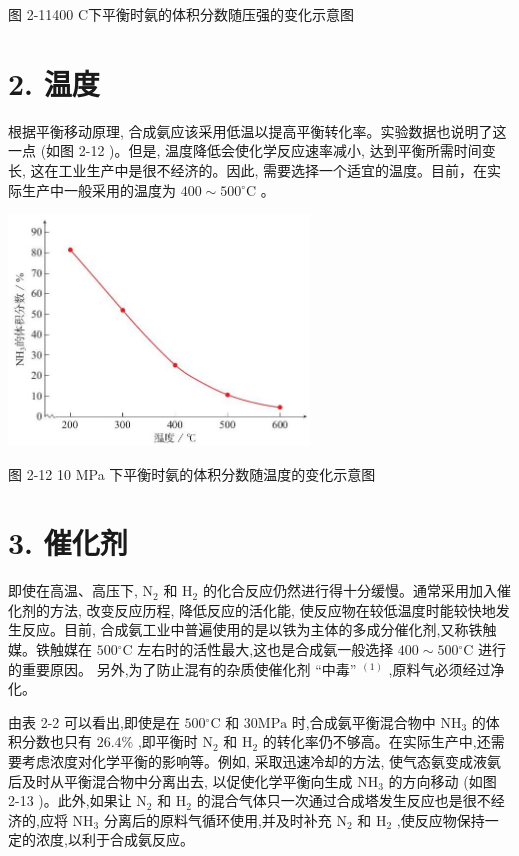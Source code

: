 \documentclass[10pt]{article}
\begin{document}
图 2-11400 C下平衡时氨的体积分数随压强的变化示意图

\section*{2. 温度}

根据平衡移动原理, 合成氨应该采用低温以提高平衡转化率。实验数据也说明了这一点 (如图 2-12 )。但是, 温度降低会使化学反应速率减小, 达到平衡所需时间变长, 这在工业生产中是很不经济的。因此, 需要选择一个适宜的温度。目前，在实际生产中一般采用的温度为 \({400} \sim {500}{}^{ \circ }\mathrm{C}\) 。

\begin{center}
\includegraphics[max width=0.6\textwidth]{images/0190da9d-8bfd-732f-bc2c-0b21d0f13b91_53_482358.jpg}
\end{center}

图 2-12 10 MPa 下平衡时氨的体积分数随温度的变化示意图

\section*{3. 催化剂}

即使在高温、高压下, \({\mathrm{N}}_{2}\) 和 \({\mathrm{H}}_{2}\) 的化合反应仍然进行得十分缓慢。通常采用加入催化剂的方法, 改变反应历程, 降低反应的活化能, 使反应物在较低温度时能较快地发生反应。目前, 合成氨工业中普遍使用的是以铁为主体的多成分催化剂,又称铁触媒。铁触媒在 \({500}{}^{ \circ }\mathrm{C}\) 左右时的活性最大,这也是合成氨一般选择 \({400} \sim {500}{}^{ \circ }\mathrm{C}\) 进行的重要原因。 另外,为了防止混有的杂质使催化剂 “中毒” \({}^{\left( 1\right) }\) ,原料气必须经过净化。

由表 2-2 可以看出,即使是在 \({500}{}^{ \circ }\mathrm{C}\) 和 \({30}\mathrm{{MPa}}\) 时,合成氨平衡混合物中 \({\mathrm{{NH}}}_{3}\) 的体积分数也只有 \({26.4}\%\) ,即平衡时 \({\mathrm{N}}_{2}\) 和 \({\mathrm{H}}_{2}\) 的转化率仍不够高。在实际生产中,还需要考虑浓度对化学平衡的影响等。例如, 采取迅速冷却的方法, 使气态氨变成液氨后及时从平衡混合物中分离出去, 以促使化学平衡向生成 \({\mathrm{{NH}}}_{3}\) 的方向移动 (如图 2-13 )。此外,如果让 \({\mathrm{N}}_{2}\) 和 \({\mathrm{H}}_{2}\) 的混合气体只一次通过合成塔发生反应也是很不经济的,应将 \({\mathrm{{NH}}}_{3}\) 分离后的原料气循环使用,并及时补充 \({\mathrm{N}}_{2}\) 和 \({\mathrm{H}}_{2}\) ,使反应物保持一定的浓度,以利于合成氨反应。
\end{document}
